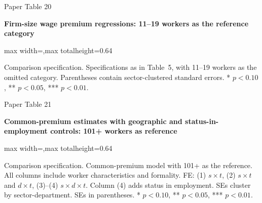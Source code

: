 \begin{frame}{Paper Table 20}
\begin{minipage}{\textwidth}\small\textbf{Firm-size wage premium regressions: 11--19 workers as the reference category}\end{minipage}\par\vspace{0.15cm}
\centering\begingroup\fontsize{8.5}{10}\selectfont
\setlength{\tabcolsep}{4pt}\renewcommand{\arraystretch}{1.06}
\begin{adjustbox}{max width=\textwidth,max totalheight=0.64\textheight}

\end{adjustbox}\endgroup\par\vspace{0.10cm}
{\fontsize{6.5}{7.5}\selectfont\raggedright Comparison specification. Specifications as in Table~5, with 11--19 workers as the omitted category. Parentheses contain sector-clustered standard errors. * $p<0.10$, ** $p<0.05$, *** $p<0.01$.\par}
\end{frame}

\begin{frame}{Paper Table 21}
\begin{minipage}{\textwidth}\small\textbf{Common-premium estimates with geographic and status-in-employment controls: 101+ workers as reference}\end{minipage}\par\vspace{0.15cm}
\centering\begingroup\fontsize{8.5}{10}\selectfont
\setlength{\tabcolsep}{4pt}\renewcommand{\arraystretch}{1.06}
\begin{adjustbox}{max width=\textwidth,max totalheight=0.64\textheight}

\end{adjustbox}\endgroup\par\vspace{0.10cm}
{\fontsize{6.5}{7.5}\selectfont\raggedright Comparison specification. Common-premium model with 101+ as the reference. All columns include worker characteristics and formality. FE: (1) $s\times t$, (2) $s\times t$ and $d\times t$, (3)--(4) $s\times d\times t$. Column (4) adds status in employment. SEs cluster by sector-department. SEs in parentheses. * $p<0.10$, ** $p<0.05$, *** $p<0.01$.\par}
\end{frame}

